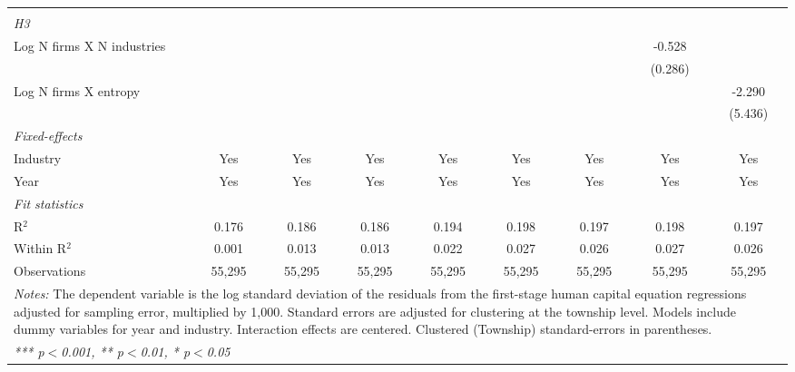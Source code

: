 \begin{tabular}{lcccccccc}
\hdashline %
\\[0.1ex] %
\emph{H3} \\ 
   Log N firms X N industries                            &                &                 &                 &                  &                 &                 & -0.528          &   \\   
                                                         &                &                 &                 &                  &                 &                 & (0.286)         &   \\   
   Log N firms X entropy                                 &                &                 &                 &                  &                 &                 &                 & -2.290\\   
                                                         &                &                 &                 &                  &                 &                 &                 & (5.436)\\   
   \midrule
   \emph{Fixed-effects}\\
   Industry                                              & Yes            & Yes             & Yes             & Yes              & Yes             & Yes             & Yes             & Yes\\  
   Year                                                  & Yes            & Yes             & Yes             & Yes              & Yes             & Yes             & Yes             & Yes\\  
   \midrule
   \emph{Fit statistics}\\
   R$^2$                                                 & 0.176          & 0.186           & 0.186           & 0.194            & 0.198           & 0.197           & 0.198           & 0.197\\  
   Within R$^2$                                          & 0.001          & 0.013           & 0.013           & 0.022            & 0.027           & 0.026           & 0.027           & 0.026\\  
   Observations                                          & 55,295         & 55,295          & 55,295          & 55,295           & 55,295          & 55,295          & 55,295          & 55,295\\  
   \midrule \midrule
\multicolumn{9}{p{24cm}}{\emph{Notes:} The dependent variable is the log 
    standard deviation of the residuals from the first-stage human capital equation 
    regressions adjusted for sampling error, multiplied by 1,000. Standard errors 
    are adjusted for clustering at the township level. Models include dummy variables 
    for year and industry. Interaction effects are centered. Clustered (Township) 
    standard-errors in parentheses.}\\
\multicolumn{9}{l}{\emph{*** p$<$0.001, ** p$<$0.01, * p$<$0.05}} \\ 
\end{tabular}
\par\endgroup

